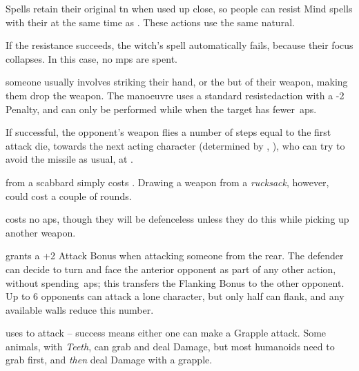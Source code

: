\begin{multicols}{2}
Spells retain their original \gls{tn} when used up close, so people can resist Mind spells with their  at the same time as .
These actions use the same \gls{natural}.

If the  resistance succeeds, the \gls{witch}'s spell automatically fails, because their focus collapses.
In this case, no \glspl{mp} are spent.

someone usually involves striking their hand, or the but of their weapon, making them drop the weapon.
The manoeuvre uses a standard  \gls{resistedaction} with a -2 Penalty, and can only be performed while when the target has fewer~\glspl{ap}.

If successful, the opponent's weapon flies a number of \glspl{step} equal to the first attack die, towards the next acting character (determined by , ), who can try to avoid the missile as usual, at \tn[12].

from a scabbard simply costs .
Drawing a weapon from a \textit{rucksack}, however, could cost a couple of \glspl{round}.

costs no \glspl{ap}, though they will be defenceless unless they do this while picking up another weapon.

grants a +2 Attack Bonus when attacking someone from the rear.
The defender can decide to turn and face the anterior opponent as part of any other action, without spending~\glspl{ap}; this transfers the Flanking Bonus to the other opponent.
Up to 6 opponents can attack a lone character, but only half can flank, and any available walls reduce this number.

\vspace{.5em}

uses  to attack -- success means either one can make a Grapple attack.
Some animals, with \textit{Teeth}, can grab and deal Damage, but most humanoids need to grab first, and \emph{then} deal Damage with a grapple.


\end{multicols}
